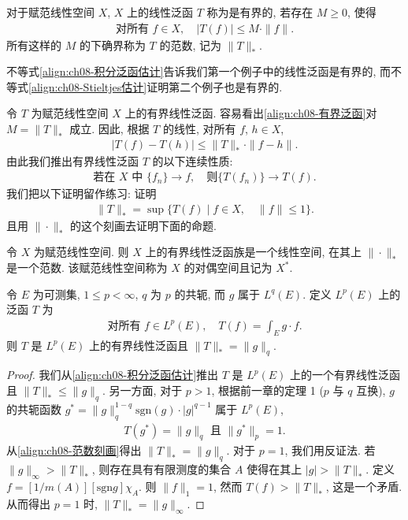 \documentclass[../../main.tex]{subfiles}
\begin{document}
\begin{definition}[有界线性泛函与范数]\label{definition:ch08-有界泛函}
对于赋范线性空间 $X$, $X$ 上的线性泛函 $T$ 称为是有界的, 若存在 $M\geqslant 0$, 使得
\begin{align}
\text{对所有 }f\in X,\quad|T(f)|\leqslant M\cdot\|f\|.\label{align:ch08-有界泛函}
\end{align}
所有这样的 $M$ 的下确界称为 $T$ 的范数, 记为 $\|T\|_{*}$.
\end{definition}

不等式\eqref{align:ch08-积分泛函估计}告诉我们第一个例子中的线性泛函是有界的, 而不等式\eqref{align:ch08-Stieltjes估计}证明第二个例子也是有界的.

令 $T$ 为赋范线性空间 $X$ 上的有界线性泛函. 容易看出\eqref{align:ch08-有界泛函}对 $M=\|T\|_{*}$ 成立. 因此, 根据 $T$ 的线性, 对所有 $f$, $h\in X$,
\begin{align}
|T(f)-T(h)|\leqslant\|T\|_{*}\cdot\|f-h\|.\label{align:ch08-泛函连续}
\end{align}
由此我们推出有界线性泛函 $T$ 的以下连续性质:
\begin{align}
\text{若在 }X\text{ 中 }\{f_{n}\}\to f,\quad\text{则}\{T(f_{n})\}\to T(f).\label{align:ch08-泛函连续性}
\end{align}
我们把以下证明留作练习: 证明
\begin{align}
\|T\|_{*}=\sup\{T(f)\mid f\in X,\quad\|f\|\leqslant 1\}.\label{align:ch08-范数刻画}
\end{align}
且用 $\|\cdot\|_{*}$ 的这个刻画去证明下面的命题.

\begin{proposition}\label{proposition:ch08-对偶空间}
令 $X$ 为赋范线性空间. 则 $X$ 上的有界线性泛函族是一个线性空间, 在其上 $\|\cdot\|_{*}$ 是一个范数. 该赋范线性空间称为 $X$ 的对偶空间且记为 $X^{*}$.
\end{proposition}

\begin{proposition}\label{proposition:ch08-积分泛函范数}
令 $E$ 为可测集, $1\leqslant p<\infty$, $q$ 为 $p$ 的共轭, 而 $g$ 属于 $L^{q}(E)$. 定义 $L^{p}(E)$ 上的泛函 $T$ 为
\begin{align*}
\text{对所有 }f\in L^{p}(E),\quad T(f)=\int_{E}g\cdot f.
\end{align*}
则 $T$ 是 $L^{p}(E)$ 上的有界线性泛函且 $\|T\|_{*}=\|g\|_{q}$.
\end{proposition}

\begin{proof}
我们从\eqref{align:ch08-积分泛函估计}推出 $T$ 是 $L^{p}(E)$ 上的一个有界线性泛函且 $\|T\|_{*}\leqslant\|g\|_{q}$. 另一方面, 对于 $p>1$, 根据前一章的定理 1 ($p$ 与 $q$ 互换), $g$ 的共轭函数 $g^{*}=\|g\|_{q}^{1-q}\mathrm{sgn}(g)\cdot|g|^{q-1}$ 属于 $L^{p}(E)$,
\begin{align*}
T(g^{*})=\|g\|_{q}\text{ 且 }\|g^{*}\|_{p}=1.
\end{align*}
从\eqref{align:ch08-范数刻画}得出 $\|T\|_{*}=\|g\|_{q}$. 对于 $p=1$, 我们用反证法. 若 $\|g\|_{\infty}>\|T\|_{*}$, 则存在具有有限测度的集合 $A$ 使得在其上 $|g|>\|T\|_{*}$. 定义 $f=[1/m(A)][\mathrm{sgn}g]\chi_{A}$. 则 $\|f\|_{1}=1$, 然而 $T(f)>\|T\|_{*}$, 这是一个矛盾. 从而得出 $p=1$ 时, $\|T\|_{*}=\|g\|_{\infty}$.
\end{proof}
\end{document}
